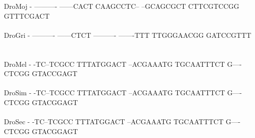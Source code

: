 \documentclass[11pt,twoside,reqno,a4paper]{article}
\begin{document}
{DroMoj	-	----------	------CACT	CAAGCCTC--	--GCAGCGCT	CTTCGTCCGG	GTTTCGACT\\
\hspace*{7\charwidth}\hspace*{1\charwidth}\hspace*{1\charwidth}\hspace*{1\charwidth}\hspace*{1\charwidth}\hspace*{1\charwidth}\hspace*{1\charwidth}\\
DroGri	-	----------	------CTCT	----------	-------TTT	TTGGGAACGG	GATCCGTTT\\
\hspace*{7\charwidth}\hspace*{1\charwidth}\hspace*{1\charwidth}\hspace*{1\charwidth}\hspace*{1\charwidth}\hspace*{1\charwidth}\hspace*{1\charwidth}\\
\\
DroMel	-	-TC--TCGCC	TTTATGGACT	--ACGAAATG	TGCAATTTCT	G----CTCGG	GTACCGAGT\\
\hspace*{7\charwidth}\hspace*{1\charwidth}\hspace*{1\charwidth}\hspace*{1\charwidth}\hspace*{1\charwidth}\hspace*{1\charwidth}\hspace*{1\charwidth}\\
DroSim	-	-TC--TCGCC	TTTATGGACT	--ACGAAATG	TGCAATTTCT	G----CTCGG	GTACGGAGT\\
\hspace*{7\charwidth}\hspace*{1\charwidth}\hspace*{1\charwidth}\hspace*{1\charwidth}\hspace*{1\charwidth}\hspace*{1\charwidth}\hspace*{1\charwidth}\\
DroSec	-	-TC--TCGCC	TTTATGGACT	--ACGAAATG	TGCAATTTCT	G----CTCGG	GTACGGAGT\\
\hspace*{7\charwidth}\hspace*{1\charwidth}\hspace*{1\charwidth}\hspace*{1\charwidth}\hspace*{1\charwidth}\hspace*{1\charwidth}\hspace*{1\charwidth}\\
}
\end{document}
